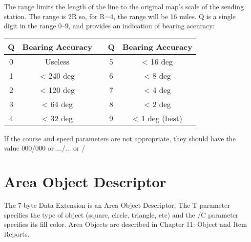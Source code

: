 The range limits the length of the line to the original map’s scale of the
sending station. The range is 2R so, for R=4, the range will be 16 miles.
Q is a single digit in the range 0–9, and provides an indication of bearing
accuracy:

\begin{tabular}{|c|c|c |c|c|}
\hline
Q & Bearing Accuracy & \hspace{2em} & Q & Bearing Accuracy \\
\hline
0 & Useless & & 5 & < 16 deg \\
\hline
1 & < 240 deg & & 6 & < 8 deg \\
\hline
2 & < 120 deg & & 7 & < 4 deg \\
\hline
3 & < 64 deg & & 8 & < 2 deg \\
\hline
4 & < 32 deg & & 9 & < 1 deg (best) \\
\hline
\end{tabular}



If the course and speed parameters are not appropriate, they should have the
value 000/000 or .../... or \textvisiblespace  \textvisiblespace  \textvisiblespace /\textvisiblespace  \textvisiblespace  \textvisiblespace

\section {Area Object Descriptor}

The 7-byte  Data Extension is an Area Object Descriptor. The T
parameter specifies the type of object (square, circle, triangle, etc) and the
/C parameter specifies its fill color.
Area Objects are described in Chapter 11: Object and Item Reports.

